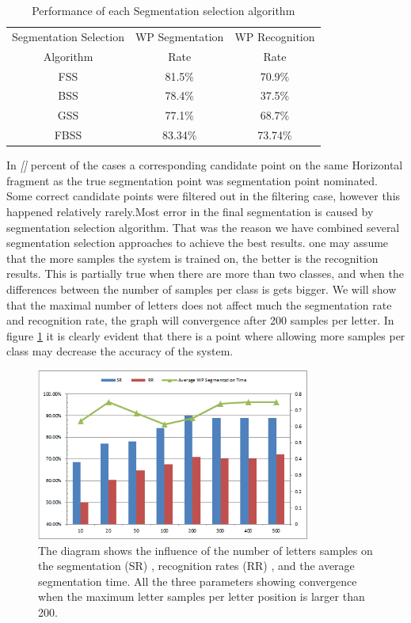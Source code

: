 \documentclass[journal,compsoc]{IEEEtran}
\begin{document}
\begin{table}[h]
\caption{Performance of each Segmentation selection algorithm}
\begin{tabular}{ | c | c | c | }
\hline
Segmentation Selection & WP Segmentation & WP Recognition \\
Algorithm & Rate & Rate \\
\hline                 
  FSS & 81.5\% & 70.9\% \\ 
  \hline
  BSS & 78.4\% &  37.5\% \\ 
 \hline
 GSS & 77.1\% & 68.7\% \\ 
 \hline
  FBSS & 83.34\% & 73.74\% \\
\hline
\end{tabular}
\centering
\label{table:ss_algorithms_results} 
\end{table}

In \emph{[]} percent of the cases a corresponding candidate point on the same Horizontal fragment as the true segmentation point was  segmentation point nominated. Some correct candidate points were filtered out in the filtering case, however this happened relatively rarely.Most error in the final segmentation is caused by segmentation selection algorithm. That was the reason we have combined several segmentation selection approaches to achieve the best results.
one may assume that the more samples the system is trained on, the better is the recognition results. This is partially true when there are more than two classes, and when the differences between the number of samples per class is gets bigger.
We will show that the maximal number of letters does not affect much the segmentation rate and recognition rate, the graph will convergence after 200 samples per letter. In figure \ref{fig:num_letter_impact} it is clearly evident that there is a point where allowing more samples per class may decrease the accuracy of the system.

\begin{figure}[h]
\centering
\includegraphics[width=9cm]{./figures/num_letter_impact}
\caption{The diagram shows the influence of the number of letters samples on the segmentation (SR) , recognition rates (RR) , and the average segmentation time. All the three parameters showing convergence when the maximum letter samples per letter position is larger than 200. }
\label{fig:num_letter_impact}
\end{figure}
\end{document}
